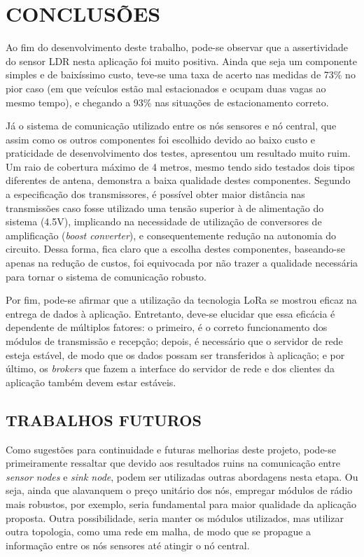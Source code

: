 \documentclass[oneside,openright,12pt]{ufsm_2015} %
\begin{document}
\chapter{CONCLUSÕES}
Ao fim do desenvolvimento deste trabalho, pode-se observar que a assertividade do sensor LDR nesta aplicação foi muito positiva. Ainda que seja um componente simples e de baixíssimo custo, teve-se uma taxa de acerto nas medidas de 73\% no pior caso (em que veículos estão mal estacionados e ocupam duas vagas ao mesmo tempo), e chegando a 93\% nas situações de estacionamento correto. 

Já o sistema de comunicação utilizado entre os nós sensores e nó central, que assim como os outros componentes foi escolhido devido ao baixo custo e praticidade de desenvolvimento dos testes, apresentou um resultado muito ruim. Um raio de cobertura máximo de 4 metros, mesmo tendo sido testados dois tipos diferentes de antena, demonstra a baixa qualidade destes componentes. Segundo a especificação dos transmissores, é possível obter maior distância nas transmissões caso fosse utilizado uma tensão superior à de alimentação do sistema (4.5V), implicando na necessidade de utilização de conversores de amplificação (\textit{boost converter}), e consequentemente redução na autonomia do circuito. Dessa forma, fica claro que a escolha destes componentes, baseando-se apenas na redução de custos, foi equivocada por não trazer a qualidade necessária para tornar o sistema de comunicação robusto.

Por fim, pode-se afirmar que a utilização da tecnologia LoRa se mostrou eficaz na entrega de dados à aplicação. Entretanto, deve-se elucidar que essa eficácia é dependente de múltiplos fatores: o primeiro, é o correto funcionamento dos módulos de transmissão e recepção; depois, é necessário que o servidor de rede esteja estável, de modo que os dados possam ser transferidos à aplicação; e por último, os \textit{brokers} que fazem a interface do servidor de rede e dos clientes da aplicação também devem estar estáveis. 


\section{TRABALHOS FUTUROS}
Como sugestões para continuidade e futuras melhorias deste projeto, pode-se primeiramente ressaltar que devido aos resultados ruins na comunicação entre \textit{sensor nodes} e \textit{sink node}, podem ser utilizadas outras abordagens nesta etapa. Ou seja, ainda que alavanquem o preço unitário dos nós, empregar módulos de rádio mais robustos, por exemplo, seria fundamental para maior qualidade da aplicação proposta. Outra possibilidade, seria manter os módulos utilizados, mas utilizar outra topologia, como uma rede em malha, de modo que se propague a informação entre os nós sensores até atingir o nó central.
\end{document}
